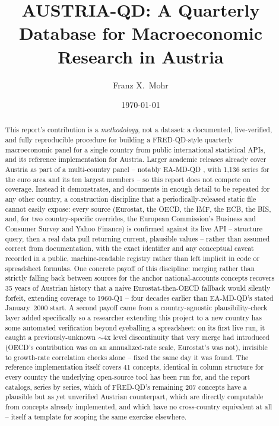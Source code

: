 \documentclass[11pt]{article}
\title{AUSTRIA-QD: A Quarterly Database for Macroeconomic Research in Austria}
\author{Franz X.\ Mohr \orcidlink{0009-0003-8890-7781}}
\date{\today}
\begin{document}
\maketitle

\begin{abstract}
\noindent This report's contribution is a \emph{methodology}, not a
dataset: a documented, live-verified, and fully reproducible procedure for
building a FRED-QD-style \citep{mccracken2020fred} quarterly macroeconomic
panel for a single country from public international statistical APIs, and
its reference implementation for Austria. Larger academic releases already
cover Austria as part of a multi-country panel -- notably EA-MD-QD
\citep{barigozzi2024eamdqd}, with 1,136 series for the euro area and its
ten largest members -- so this report does not compete on coverage.
Instead it demonstrates, and documents in enough detail to be repeated for
any other country, a construction discipline that a periodically-released
static file cannot easily expose: every source (Eurostat, the OECD, the
IMF, the ECB, the BIS, and, for two country-specific overrides, the
European Commission's Business and Consumer Survey and Yahoo Finance) is
confirmed against its live API -- structure query, then a real data pull
returning current, plausible values -- rather than assumed correct from
documentation, with the exact identifier and any conceptual caveat
recorded in a public, machine-readable registry rather than left implicit
in code or spreadsheet formulas. One concrete payoff of this discipline:
merging rather than strictly falling back between sources for the anchor
national-accounts concepts recovers 35 years of Austrian history that a
naive Eurostat-then-OECD fallback would silently forfeit, extending
coverage to 1960-Q1 -- four decades earlier than EA-MD-QD's stated
January~2000 start. A second payoff came from a country-agnostic
plausibility-check layer added specifically so a researcher extending
this project to a new country has some automated verification beyond
eyeballing a spreadsheet: on its first live run, it caught a
previously-unknown $\sim$4x level discontinuity that very merge had
introduced (OECD's contribution was on an annualized-rate scale,
Eurostat's was not), invisible to growth-rate correlation checks alone
-- fixed the same day it was found. The reference implementation itself
covers 41 concepts, identical in column structure for every country the
underlying open-source tool has been run for, and the report catalogs,
series by series, which of FRED-QD's remaining 207 concepts have a
plausible but as yet unverified Austrian counterpart, which are directly
computable from concepts already implemented, and which have no
cross-country equivalent at all -- itself a template for scoping the same
exercise elsewhere.
\end{abstract}
\end{document}
